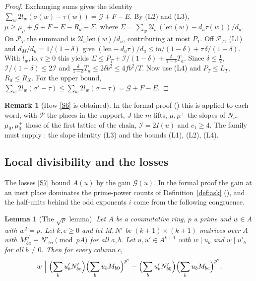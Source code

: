 \documentclass[11pt]{amsart}
\theoremstyle{plain}
\newtheorem{lemma}[theorem]{Lemma}
\theoremstyle{definition}
\newtheorem{remark}[theorem]{Remark}
\numberwithin{equation}{section}
\begin{document}
\begin{proof}
Exchanging sums gives the identity $\sum_w2l_w(\sigma(w)-\tau(w))=\mathcal G+F-E$. By (L2) and (L3),
$\mu\ge\mu_\mu+\mathcal G+F-E-R_d-\Sigma$, where $\Sigma=\sum_w2l_w(\mathrm{len}(w)-d_u\tau(w))/d_u$. On
$\mathcal P_T$ the summand is $2l_w\mathrm{len}(w)/d_u$, contributing at most $P_T$. Off $\mathcal P_T$,
(L1) and $d_M/d_u=1/(1-\delta)$ give
$(\mathrm{len}-d_u\tau)/d_u\le\mathrm{io}/(1-\delta)+\tau\,\delta/(1-\delta)$. With $l_w,\mathrm{io},\tau\ge0$
this yields $\Sigma\le P_T+\mathcal I/(1-\delta)+\frac{\delta}{1-\delta}T_a$. Since $\delta\le\frac12$,
$\mathcal I/(1-\delta)\le2\mathcal I$ and $\frac{\delta}{1-\delta}T_a\le2\delta b^2\le4fb^2/T$. Now use (L4)
and $P_T\le L_T$, $R_d\le R_X$. For the upper bound,
$\sum_w2l_w(\sigma'-\tau)\le\sum_w2l_w(\sigma-\tau)=\mathcal G+F-E$.
\end{proof}

\begin{remark}[How \ref{S6} is obtained]\label{rem:S6}
In the formal proof () this is applied to each word, with $\mathcal P$ the places
in the support, $J$ the $m$ lifts, $\mu,\mu^+$ the slopes of $N_\nu$, $\mu_0,\mu_0^+$ those of the first
lattice of the chain, $\mathcal I=2I(u)$ and $c_1\ge4$. The family must supply : the
slope identity (L3) and the bounds (L1), (L2), (L4).
\end{remark}

\subsection{Local divisibility and the losses}

The losses \ref{S7} bound $A(u)$ by the gain $\mathcal G(u)$. In the formal proof the gain at an
inert place dominates the prime-power counts of Definition~\ref{def:ask} (), and the
half-units behind the odd exponents $i$ come from the following congruence.

\begin{lemma}[The $\sqrt p$ lemma]\label{lem:sqrtp}
Let $A$ be a commutative ring, $p$ a prime and $w\in A$ with $w^2=p$. Let $k,e\ge0$ and let $M,N'$
be $(k+1)\times(k+1)$ matrices over $A$ with $M_{ba}^{p^e}\equiv N'_{ba}\pmod{pA}$ for all $a,b$. Let
$u,u'\in A^{k+1}$ with $w\mid u_b$ and $w\mid u'_b$ for all $b\ne0$. Then for every column $c$,
\[
w\ \Big|\ \Bigl(\sum_bu'_bN'_{bc}\Bigr)\Bigl(\sum_bu_bM_{b0}\Bigr)^{p^e}-\Bigl(\sum_bu'_bN'_{b0}\Bigr)\Bigl(\sum_bu_bM_{bc}\Bigr)^{p^e}.
\]
\end{lemma}
\end{document}
